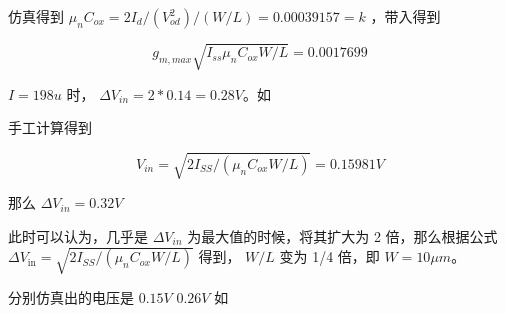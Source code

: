 \documentclass[lang=cn,11pt,a4paper,cite=authoryear]{elegantpaper}
\begin{document}
仿真得到 \(\mu_n C_{ox} = 2 I_d / (V_{od}^2) / (W/L) = 0.00039157 = k\) ，带入得到

\[g_{m,max} \sqrt{I_{ss} \mu_nC_{ox} W/L}  = 0.0017699\]



\(I = 198 u\) 时， \(\Delta V_{in} = 2 * 0.14 = 0.28 V\)。如

手工计算得到

\[V_{in} =\sqrt{2 I_{S S} /\left(\mu_{n} C_{o x} W / L\right)} = 0.15981 V\] 

那么 \(\Delta V_{in} = 0.32 V\)


此时可以认为，几乎是 \(\Delta V_{in}\) 为最大值的时候，将其扩大为 2 倍，那么根据公式 $\Delta V_{\text {in}}=\sqrt{2 I_{S S} /\left(\mu_{n} C_{o x} W / L\right)}$ 得到， \(W/L\) 变为 1/4 倍，即 \(W = 10 \mu m\)。

分别仿真出的电压是 \(0.15V\) \(0.26V\) 如 












\end{document}
